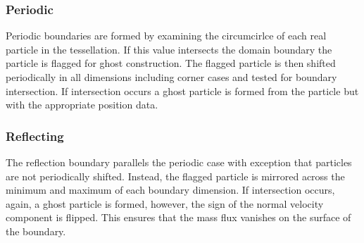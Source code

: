 \subsubsection{Periodic}
Periodic boundaries are formed by examining the circumcirlce of each real particle
in the tessellation. If this value intersects the domain boundary the particle is
flagged for ghost construction. The flagged particle is then shifted periodically in
all dimensions including corner cases and tested for boundary intersection. If 
intersection occurs a ghost particle is formed from the particle but with the
appropriate position data.

\subsubsection{Reflecting}
The reflection boundary parallels the periodic case with exception that particles
are not periodically shifted. Instead, the flagged particle is mirrored across the
minimum and maximum of each boundary dimension. If intersection occurs, again, a ghost
particle is formed, however, the sign of the normal velocity component is flipped.
This ensures that the mass flux vanishes on the surface of the boundary.

